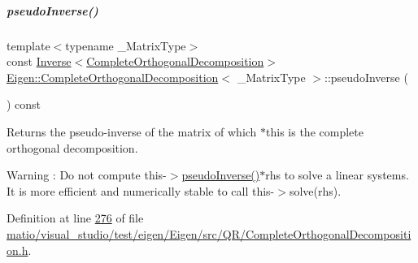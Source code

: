 \mbox{\label{group___q_r___module_a3c89639299720ce089435d26d6822d6f}} 
\subparagraph{\texorpdfstring{pseudo\+Inverse()}{pseudoInverse()}\hspace{0.1cm}{\footnotesize\ttfamily [2/2]}}
{\footnotesize\ttfamily template$<$typename \+\_\+\+Matrix\+Type$>$ \\
const \hyperlink{class_eigen_1_1_inverse}{Inverse}$<$\hyperlink{group___q_r___module_class_eigen_1_1_complete_orthogonal_decomposition}{Complete\+Orthogonal\+Decomposition}$>$ \hyperlink{group___q_r___module_class_eigen_1_1_complete_orthogonal_decomposition}{Eigen\+::\+Complete\+Orthogonal\+Decomposition}$<$ \+\_\+\+Matrix\+Type $>$\+::pseudo\+Inverse (\begin{DoxyParamCaption}{ }\end{DoxyParamCaption}) const\hspace{0.3cm}{\ttfamily [inline]}}

\begin{DoxyReturn}{Returns}
the pseudo-\/inverse of the matrix of which $\ast$this is the complete orthogonal decomposition. 
\end{DoxyReturn}
\begin{DoxyWarning}{Warning}
\+: Do not compute {\ttfamily this-\/$>$\hyperlink{group___q_r___module_a3c89639299720ce089435d26d6822d6f}{pseudo\+Inverse()}$\ast$rhs} to solve a linear systems. It is more efficient and numerically stable to call {\ttfamily this-\/$>$solve(rhs)}. 
\end{DoxyWarning}


Definition at line \hyperlink{matio_2visual__studio_2test_2eigen_2_eigen_2src_2_q_r_2_complete_orthogonal_decomposition_8h_source_l00276}{276} of file \hyperlink{matio_2visual__studio_2test_2eigen_2_eigen_2src_2_q_r_2_complete_orthogonal_decomposition_8h_source}{matio/visual\+\_\+studio/test/eigen/\+Eigen/src/\+Q\+R/\+Complete\+Orthogonal\+Decomposition.\+h}.

